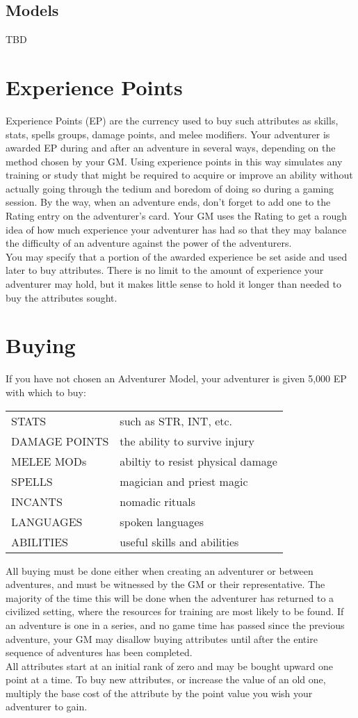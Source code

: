 \begin{multicols}{2}
\subsection{Models}
TBD
\section{Experience Points}
Experience Points (EP) are the currency used to buy such attributes as skills, stats, spells groups, damage points, and melee modifiers. Your adventurer is awarded EP during and after an adventure in several ways, depending on the method chosen by your GM. Using experience points in this way simulates any training or study that might be required to acquire or improve an ability without actually going through the tedium and boredom of doing so during a gaming session. By the way, when an adventure ends, don’t forget to add one to the Rating entry on the adventurer’s card. Your GM uses the Rating to get a rough idea of how much experience your adventurer has had so that they may balance the difficulty of an adventure against the power of the adventurers.\\
You may specify that a portion of the awarded experience be set aside and used later to buy attributes. There is no limit to the amount of experience your adventurer may hold, but it makes little sense to hold it longer than needed to buy the attributes sought.
\section{Buying}
\label{create-buying}
If you have not chosen an Adventurer Model, your adventurer is given 5,000 EP with which to buy:

\begin{tabular}{l l}
STATS & such as STR, INT, etc.\\
DAMAGE POINTS  & the ability to survive injury\\
MELEE MODs & abiltiy to resist physical damage\\
SPELLS & magician and priest magic\\
INCANTS & nomadic rituals\\
LANGUAGES & spoken languages\\
ABILITIES & useful skills and abilities\\
\end{tabular}

All buying must be done either when creating an adventurer or between adventures, and must be witnessed by the GM or their representative. The majority of the time this will be done when the adventurer has returned to a civilized setting, where the resources for training are most likely to be found. If an adventure is one in a series, and no game time has passed since the previous adventure, your GM may disallow buying attributes until after the entire sequence of adventures has been completed. \\
All attributes start at an initial rank of zero and may be bought upward one point at a time. To buy new attributes, or increase the value of an old one, multiply the base cost of the attribute by the point value you wish your adventurer to gain.


\end{multicols}
